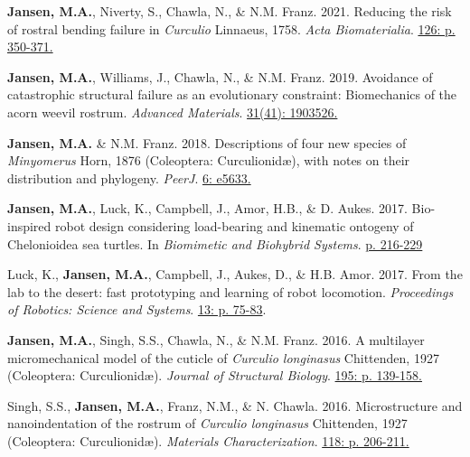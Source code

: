 \documentclass[12pt,a4paper]{article}
\begin{document}
\begin{description}
		\item \textbf{Jansen, M.A.}, Niverty, S., Chawla, N., \& N.M. Franz. 2021. Reducing the risk of rostral bending failure in \textit{Curculio} Linnaeus, 1758. \textit{Acta Biomaterialia}. \href{https://doi.org/10.1016/j.actbio.2021.03.029}{126: p. 350-371.}
		
		\item \textbf{Jansen, M.A.}, Williams, J., Chawla, N., \& N.M. Franz. 2019. Avoidance of catastrophic structural failure as an evolutionary constraint: Biomechanics of the acorn weevil rostrum. \textit{Advanced Materials}. \href{https://doi.org/10.1002/adma.201903526}{31(41): 1903526.}
		
		\item \textbf{Jansen, M.A.} \& N.M. Franz. 2018. Descriptions of four new species of \textit{Minyomerus} Horn, 1876 (Coleoptera: Curculionid\ae), with notes on their distribution and phylogeny. \textit{PeerJ}. \href{https://peerj.com/articles/5633/}{6: e5633.}
		
		\item \textbf{Jansen, M.A.}, Luck, K., Campbell, J., Amor, H.B., \& D. Aukes. 2017. Bio-inspired robot design considering load-bearing and kinematic ontogeny of Chelonioidea sea turtles. In \textit{Biomimetic and Biohybrid Systems}. \href{http://www.springer.com/us/book/9783319635361}{p. 216-229}
		
		\item Luck, K., \textbf{Jansen, M.A.}, Campbell, J., Aukes, D., \& H.B. Amor. 2017. From the lab to the desert: fast prototyping and learning of robot locomotion. \textit{Proceedings of Robotics: Science and Systems}. \href{http://www.roboticsproceedings.org/rss13/p75.html}{13: p. 75-83}.
		
		\item \textbf{Jansen, M.A.}, Singh, S.S., Chawla, N., \& N.M. Franz. 2016. A multilayer micromechanical model of the cuticle of \textit{Curculio longinasus} Chittenden, 1927 (Coleoptera: Curculionid\ae). \textit{Journal of Structural Biology}. \href{http://www.sciencedirect.com/science/article/pii/S1047847716300922}{195: p. 139-158.}
		
		\item Singh, S.S., \textbf{Jansen, M.A.}, Franz, N.M., \& N. Chawla. 2016. Microstructure and nanoindentation of the rostrum of \textit{Curculio longinasus} Chittenden, 1927 (Coleoptera: Curculionid\ae). \textit{Materials Characterization}. \href{http://www.sciencedirect.com/science/article/pii/S1044580316301619}{118: p. 206-211.}
		

\end{description}
\end{document}
